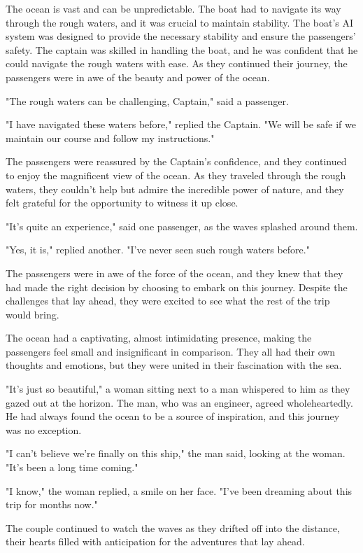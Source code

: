 \documentclass[smalldemyvopaper,11pt,twoside,onecolumn,openright,extrafontsizes]{memoir}
\begin{document}
The ocean is vast and can be unpredictable. The boat had to navigate its way through the rough waters, and it was crucial to maintain stability. The boat's AI system was designed to provide the necessary stability and ensure the passengers' safety. The captain was skilled in handling the boat, and he was confident that he could navigate the rough waters with ease. As they continued their journey, the passengers were in awe of the beauty and power of the ocean.\par
"The rough waters can be challenging, Captain," said a passenger.\par
"I have navigated these waters before," replied the Captain. "We will be safe if we maintain our course and follow my instructions."\par
The passengers were reassured by the Captain's confidence, and they continued to enjoy the magnificent view of the ocean. As they traveled through the rough waters, they couldn't help but admire the incredible power of nature, and they felt grateful for the opportunity to witness it up close.\par
"It's quite an experience," said one passenger, as the waves splashed around them.\par
"Yes, it is," replied another. "I've never seen such rough waters before."\par
The passengers were in awe of the force of the ocean, and they knew that they had made the right decision by choosing to embark on this journey. Despite the challenges that lay ahead, they were excited to see what the rest of the trip would bring.\par
The ocean had a captivating, almost intimidating presence, making the passengers feel small and insignificant in comparison. They all had their own thoughts and emotions, but they were united in their fascination with the sea.\par
"It's just so beautiful," a woman sitting next to a man whispered to him as they gazed out at the horizon. The man, who was an engineer, agreed wholeheartedly. He had always found the ocean to be a source of inspiration, and this journey was no exception.\par
"I can't believe we're finally on this ship," the man said, looking at the woman. "It's been a long time coming."\par
"I know," the woman replied, a smile on her face. "I've been dreaming about this trip for months now."\par
The couple continued to watch the waves as they drifted off into the distance, their hearts filled with anticipation for the adventures that lay ahead.\par
\end{document}
